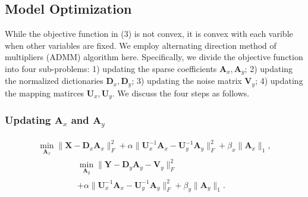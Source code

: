 \documentclass[10pt,twocolumn,letterpaper]{article}
\begin{document}
\subsection{Model Optimization}
While the objective function in (3) is not convex, it is convex with each varible when other variables are fixed. We employ alternating direction method of multipliers (ADMM) algorithm here. Specifically, we divide the objective function into four sub-problems: 1) updating the sparse coefficients $\mathbf{A}_{x}, \mathbf{A}_{y}$; 2) updating the normalized dictionaries $\mathbf{D}_{x}, \mathbf{D}_{y}$; 3) updating the noise matrix $\mathbf{V}_{y}$; 4) updating the mapping matirces $\mathbf{U}_{x}, \mathbf{U}_{y}$. We discuss the four steps as follows.

\subsubsection{Updating $\mathbf{A}_{x}$ and $\mathbf{A}_{y}$}

\begin{equation}
\begin{split}
\min_{\mathbf{A}_{x}}
\|\mathbf{X}-\mathbf{D}_{x}\mathbf{A}_{x}\|_{F}^{2}
+
\alpha
\|\mathbf{U}_{x}^{-1}\mathbf{A}_{x}-\mathbf{U}_{y}^{-1}\mathbf{A}_{y}\|_{F}^{2}
+
\beta_{x}\|\mathbf{A}_{x}\|_{1},
\end{split}
\end{equation}
\begin{equation}
\begin{split}
\min_{\mathbf{A}_{y}}
\|\mathbf{Y}-\mathbf{D}_{y}\mathbf{A}_{y}-\mathbf{V}_{y}\|_{F}^{2}&
\\
+
\alpha
\|\mathbf{U}_{x}^{-1}\mathbf{A}_{x}-\mathbf{U}_{y}^{-1}\mathbf{A}_{y}\|_{F}^{2}
+
\beta_{y}\|\mathbf{A}_{y}\|_{1}.
\end{split}
\end{equation}
\end{document}
